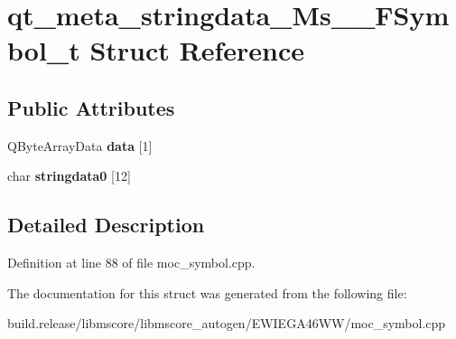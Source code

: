 \hypertarget{structqt__meta__stringdata___ms_____f_symbol__t}{}\section{qt\+\_\+meta\+\_\+stringdata\+\_\+\+Ms\+\_\+\+\_\+\+F\+Symbol\+\_\+t Struct Reference}
\label{structqt__meta__stringdata___ms_____f_symbol__t}
\subsection*{Public Attributes}
\begin{DoxyCompactItemize}
\item 
\mbox{\label{structqt__meta__stringdata___ms_____f_symbol__t_a38f334aa5b37873e64dc4d143f1fe725}} 
Q\+Byte\+Array\+Data {\bfseries data} \mbox{[}1\mbox{]}
\item 
\mbox{\label{structqt__meta__stringdata___ms_____f_symbol__t_aa72b74e8f9b70794f1aab1a5207e0d20}} 
char {\bfseries stringdata0} \mbox{[}12\mbox{]}
\end{DoxyCompactItemize}


\subsection{Detailed Description}


Definition at line 88 of file moc\+\_\+symbol.\+cpp.



The documentation for this struct was generated from the following file\+:\begin{DoxyCompactItemize}
\item 
build.\+release/libmscore/libmscore\+\_\+autogen/\+E\+W\+I\+E\+G\+A46\+W\+W/moc\+\_\+symbol.\+cpp\end{DoxyCompactItemize}
